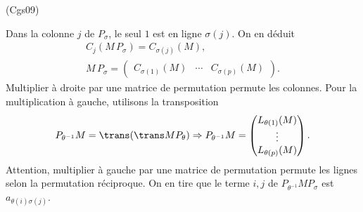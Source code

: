 \begin{tiny}(Cgs09)\end{tiny} Dans la colonne $j$ de $P_{\sigma}$, le seul $1$ est en ligne $\sigma(j)$. On en déduit
\begin{multline*}
 C_j(M\, P_{\sigma}) = C_{\sigma(j)}(M), \\
 M\, P_{\sigma} = 
 \begin{pmatrix}
  C_{\sigma(1)}(M) & \cdots & C_{\sigma(p)}(M)
 \end{pmatrix}.
\end{multline*}
Multiplier à droite par une matrice de permutation permute les colonnes.
Pour la multiplication à gauche, utilisons la transposition
\[
 P_{\theta^{-1}} M = \trans (\trans M P_{\theta}) 
 \Rightarrow P_{\theta^{-1}} M = 
 \begin{pmatrix}
  L_{\theta(1)}(M) \\ \vdots \\ L_{\theta(p)}(M)
 \end{pmatrix} .
\]
Attention, multiplier à gauche par une matrice de permutation permute les lignes selon la permutation réciproque.\newline
On en tire que le terme $i,j$ de $P_{\theta^{-1}} M P_{\sigma}$ est $a_{\theta(i) \sigma(j)}$.
